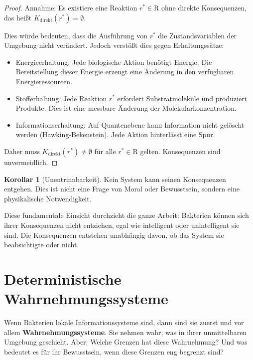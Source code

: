 \documentclass[a4paper,12pt]{article}
\theoremstyle{definition}
\newtheorem{korollar}{Korollar}
\begin{document}
\begin{proof}
Annahme: Es existiere eine Reaktion $r^* \in \text{R}$ ohne direkte Konsequenzen, das heißt $K_{\text{direkt}}(r^*) = \emptyset$.

Dies würde bedeuten, dass die Ausführung von $r^*$ die Zustandsvariablen der Umgebung nicht verändert. Jedoch verstößt dies gegen Erhaltungssätze:

\begin{itemize}
    \item[-] Energieerhaltung: Jede biologische Aktion benötigt Energie. Die Bereitstellung dieser Energie erzeugt eine Änderung in den verfügbaren Energieressourcen.
    
    \item[-] Stofferhaltung: Jede Reaktion $r^*$ erfordert Substratmoleküle und produziert Produkte. Dies ist eine messbare Änderung der Molekularkonzentration.
    
    \item[-] Informationserhaltung: Auf Quantenebene kann Information nicht gelöscht werden (Hawking-Bekenstein). Jede Aktion hinterlässt eine Spur.
\end{itemize}

Daher muss $K_{\text{direkt}}(r^*) \neq \emptyset$ für alle $r^* \in \text{R}$ gelten. Konsequenzen sind unvermeidlich.
\end{proof}

\begin{korollar}[Unentrinnbarkeit]
Kein System kann seinen Konsequenzen entgehen. Dies ist nicht eine Frage von Moral oder Bewusstsein, sondern eine physikalische Notwendigkeit.
\end{korollar}

Diese fundamentale Einsicht durchzieht die ganze Arbeit: Bakterien können sich ihrer Konsequenzen nicht entziehen, egal wie intelligent oder unintelligent sie sind. Die Konsequenzen entstehen unabhängig davon, ob das System sie beabsichtigte oder nicht.

\section{Deterministische Wahrnehmungssysteme}

Wenn Bakterien lokale Informationssysteme sind, dann sind sie zuerst und vor allem \textbf{Wahrnehmungssysteme}. Sie nehmen wahr, was in ihrer unmittelbaren Umgebung geschieht. Aber: Welche Grenzen hat diese Wahrnehmung? Und was bedeutet es für ihr Bewusstsein, wenn diese Grenzen eng begrenzt sind?
\end{document}
